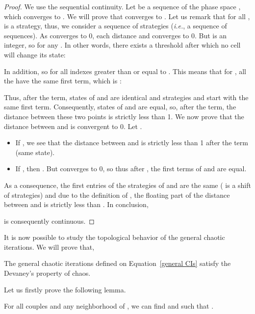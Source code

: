 \documentclass{article}
\begin{document}
\begin{proof}
We use the sequential continuity.
Let  be a sequence of the phase space , which converges to . We will prove that  converges to . Let us remark that for all ,  is a strategy,
thus, we consider a sequence of strategies (\emph{i.e.}, a sequence of
sequences).\newline
As  converges to 0, each distance  and  converges
to 0. But  is an integer, so   for any .\newline
In other words, there exists a threshold  after which no
cell will change its state:


In addition,  so  for all indexes greater than or equal to . This means that for , all the  have the same
first term, which is : 

Thus, after the  term, states of  and  are
identical and strategies  and  start with the same first term.\newline
Consequently, states of  and  are equal,
so, after the  term, the distance  between these two points is strictly less than 1.\newline
\noindent We now prove that the distance between  and  is convergent to
0. Let . \medskip
\begin{itemize}
\item If , we see that the distance
between  and  is
strictly less than 1 after the  term (same state).
\medskip
\item If , then . But  converges to 0, so
thus after , the  first terms of  and  are equal.
\end{itemize}
\noindent As a consequence, the  first entries of the strategies of  and  are the same ( is a shift of strategies) and due to the definition of , the floating part of
the distance between  and  is strictly less than .\bigskip \newline
In conclusion,

 is consequently continuous.
\end{proof}


It is now possible to study the topological behavior of the general chaotic
iterations. We will prove that,

\begin{theorem}
\label{t:chaos des general}
 The general chaotic iterations defined on Equation~\ref{general CIs} satisfy
the Devaney's property of chaos.
\end{theorem}

Let us firstly prove the following lemma.

\begin{lemma}
\label{strongTrans}
 For all couples  and any neighborhood  of , we can 
find  and  such that .
\end{lemma}
\end{document}
